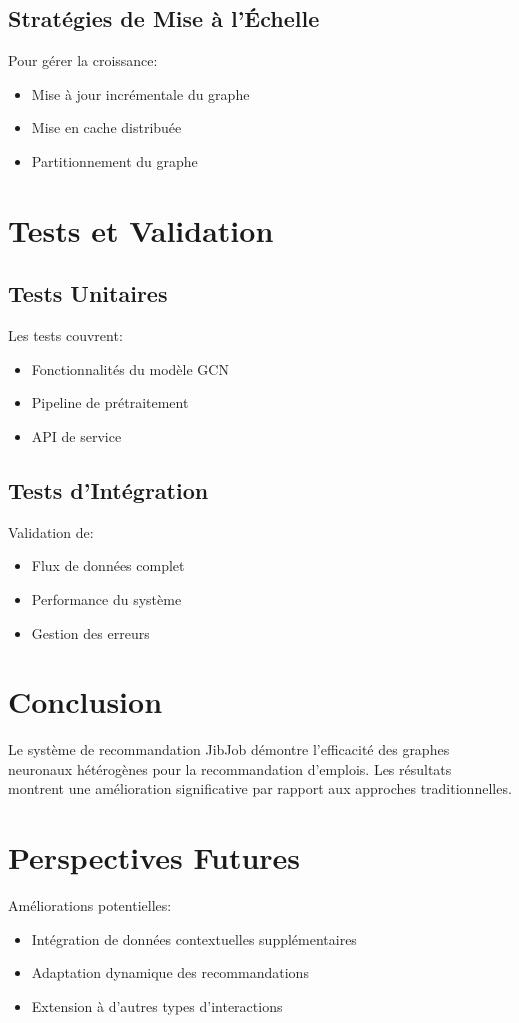 \documentclass[12pt,a4paper]{article}
\begin{document}
\subsection{Stratégies de Mise à l'Échelle}
Pour gérer la croissance:
\begin{itemize}
    \item Mise à jour incrémentale du graphe
    \item Mise en cache distribuée
    \item Partitionnement du graphe
\end{itemize}

\section{Tests et Validation}
\subsection{Tests Unitaires}
Les tests couvrent:
\begin{itemize}
    \item Fonctionnalités du modèle GCN
    \item Pipeline de prétraitement
    \item API de service
\end{itemize}

\subsection{Tests d'Intégration}
Validation de:
\begin{itemize}
    \item Flux de données complet
    \item Performance du système
    \item Gestion des erreurs
\end{itemize}

\section{Conclusion}
Le système de recommandation JibJob démontre l'efficacité des graphes neuronaux hétérogènes pour la recommandation d'emplois. Les résultats montrent une amélioration significative par rapport aux approches traditionnelles.

\section{Perspectives Futures}
Améliorations potentielles:
\begin{itemize}
    \item Intégration de données contextuelles supplémentaires
    \item Adaptation dynamique des recommandations
    \item Extension à d'autres types d'interactions
\end{itemize}
\end{document}
